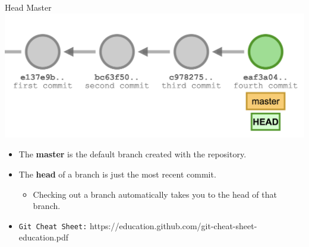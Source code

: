 \documentclass[11pt]{beamer}
\begin{document}
\begin{frame}{Head Master}
\center
\includegraphics[scale=0.2]{commitchain.png}
\begin{itemize}
    \item The \textbf{master} is the default branch created with the repository. 
    \item The \textbf{head} of a branch is just the most recent commit.  
    \begin{itemize}
        \item Checking out a branch automatically takes you to the head of that branch.  
    \end{itemize}
    \item \texttt{Git Cheat Sheet:} https://education.github.com/git-cheat-sheet-education.pdf
\end{itemize}
\end{frame}
\end{document}
